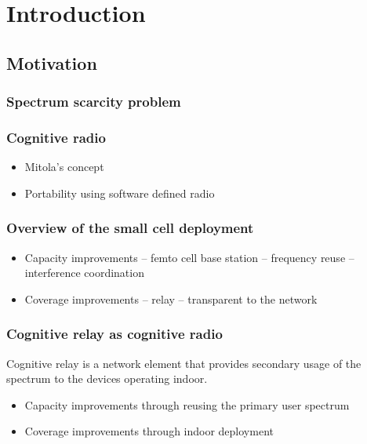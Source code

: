 \chapter{Introduction}

\section{Motivation}
\label{sec:mot}

\subsection{Spectrum scarcity problem}

\subsection{Cognitive radio}
\begin{itemize}
\item Mitola's concept
\item Portability using software defined radio 
\end{itemize}

\subsection{Overview of the small cell deployment}
\begin{itemize}
\item Capacity improvements -- femto cell base station -- frequency reuse -- interference coordination  
\item Coverage improvements -- relay -- transparent to the network  
\end{itemize}

\subsection{Cognitive relay as cognitive radio}
Cognitive relay is a network element that provides secondary usage of the spectrum to the devices operating indoor. 
\begin{itemize}
\item Capacity improvements through reusing the primary user spectrum 
\item Coverage improvements through indoor deployment  
\end{itemize}

